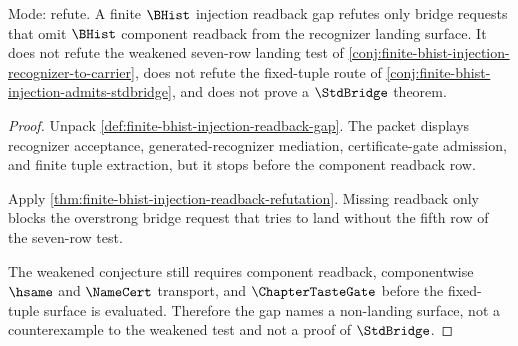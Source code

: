\begin{theorem}
\label{thm:finite-bhist-injection-readback-gap-refutes-bridge}
Mode: refute. A finite $\BHist$ injection readback gap refutes only bridge requests that omit $\BHist$ component readback from the recognizer landing surface. It does not refute the weakened seven-row landing test of \autoref{conj:finite-bhist-injection-recognizer-to-carrier}, does not refute the fixed-tuple route of \autoref{conj:finite-bhist-injection-admits-stdbridge}, and does not prove a $\StdBridge$ theorem.
\end{theorem}
\begin{proof}
Unpack \autoref{def:finite-bhist-injection-readback-gap}. The packet displays recognizer acceptance, generated-recognizer mediation, certificate-gate admission, and finite tuple extraction, but it stops before the component readback row.

Apply \autoref{thm:finite-bhist-injection-readback-refutation}. Missing readback only blocks the overstrong bridge request that tries to land without the fifth row of the seven-row test.

The weakened conjecture still requires component readback, componentwise $\hsame$ and $\NameCert$ transport, and $\ChapterTasteGate$ before the fixed-tuple surface is evaluated. Therefore the gap names a non-landing surface, not a counterexample to the weakened test and not a proof of $\StdBridge$.
\end{proof}

